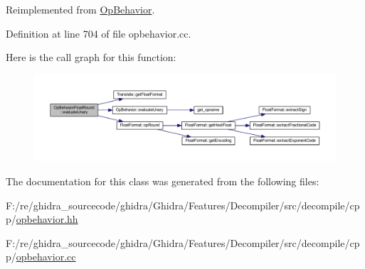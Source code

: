 Reimplemented from \mbox{\hyperlink{class_op_behavior_acd4f5a1c0dee0414f3c541620b88fe45}{Op\+Behavior}}.



Definition at line 704 of file opbehavior.\+cc.

Here is the call graph for this function\+:
\nopagebreak
\begin{figure}[H]
\begin{center}
\leavevmode
\includegraphics[width=350pt]{class_op_behavior_float_round_aa57d5042b97051885643fb757c8f10a6_cgraph}
\end{center}
\end{figure}


The documentation for this class was generated from the following files\+:\begin{DoxyCompactItemize}
\item 
F\+:/re/ghidra\+\_\+sourcecode/ghidra/\+Ghidra/\+Features/\+Decompiler/src/decompile/cpp/\mbox{\hyperlink{opbehavior_8hh}{opbehavior.\+hh}}\item 
F\+:/re/ghidra\+\_\+sourcecode/ghidra/\+Ghidra/\+Features/\+Decompiler/src/decompile/cpp/\mbox{\hyperlink{opbehavior_8cc}{opbehavior.\+cc}}\end{DoxyCompactItemize}
